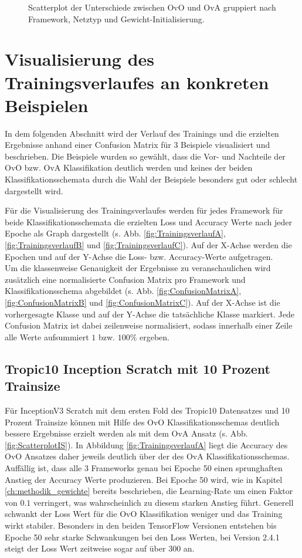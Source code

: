 \begin{figure}[H]
\begin{adjustbox}{width=1.4\textwidth, center}

\end{adjustbox}
\caption{Scatterplot der Unterschiede zwischen OvO und OvA gruppiert nach Framework, Netztyp und Gewicht-Initialisierung.}
\label{fig:ScatterplotGesamt}
\end{figure}
\newpage
\section{Visualisierung des Trainingsverlaufes an konkreten Beispielen}
\label{ch:Beispiele}
In dem folgenden Abschnitt wird der Verlauf des Trainings und die erzielten Ergebnisse anhand einer Confusion Matrix für 3 Beispiele visualisiert und beschrieben. Die Beispiele wurden so gewählt, dass die Vor- und Nachteile der OvO bzw. OvA Klassifikation deutlich werden und keines der beiden Klassifikationsschemata durch die Wahl der Beispiele besonders gut oder schlecht dargestellt wird.

Für die Visualisierung des Trainingsverlaufes werden für jedes Framework für beide Klassifikationsschemata die erzielten Loss und Accuracy Werte nach jeder Epoche als Graph dargestellt (s. Abb. \ref{fig:TrainingsverlaufA}, \ref{fig:TrainingsverlaufB} und \ref{fig:TrainingsverlaufC}). Auf der X-Achse werden die Epochen und auf der Y-Achse die Loss- bzw. Accuracy-Werte aufgetragen.\\

Um die klassenweise Genauigkeit der Ergebnisse zu veranschaulichen wird zusätzlich eine normalisierte Confusion Matrix pro Framework und Klassifikationsschema abgebildet (s. Abb. \ref{fig:ConfusionMatrixA}, \ref{fig:ConfusionMatrixB} und \ref{fig:ConfusionMatrixC}). Auf der X-Achse ist die vorhergesagte Klasse und auf der Y-Achse die tatsächliche Klasse markiert. Jede Confusion Matrix ist dabei zeilenweise normalisiert, sodass innerhalb einer Zeile alle Werte aufsummiert $1$ bzw. $100\%$  ergeben.
\subsection{Tropic10 Inception Scratch mit 10 Prozent Trainsize}
\label{ch:BeispielA}
Für InceptionV3 Scratch mit dem ersten Fold des Tropic10 Datensatzes und 10 Prozent Trainsize können mit Hilfe des OvO Klassifikationsschemas deutlich bessere Ergebnisse erzielt werden als mit dem OvA Ansatz (s. Abb. \ref{fig:ScatterplotIS}).
In Abbildung \ref{fig:TrainingsverlaufA} liegt die Accuracy des OvO Ansatzes daher jeweils deutlich über der des OvA Klassifikationsschemas. Auffällig ist, dass alle 3 Frameworks genau bei Epoche 50 einen sprunghaften Anstieg der Accuracy Werte produzieren. Bei Epoche 50 wird, wie in Kapitel \ref{ch:methodik_gewichte} bereits beschrieben, die Learning-Rate um einen Faktor von $0.1$ verringert, was wahrscheinlich zu diesem starken Anstieg führt. Generell schwankt der Loss Wert für die OvO Klassifikation weniger und das Training wirkt stabiler. Besonders in den beiden TensorFlow \cite{tensorflow} Versionen entstehen bis Epoche 50 sehr starke Schwankungen bei den Loss Werten, bei Version 2.4.1 steigt der Loss Wert zeitweise sogar auf über 300 an.

